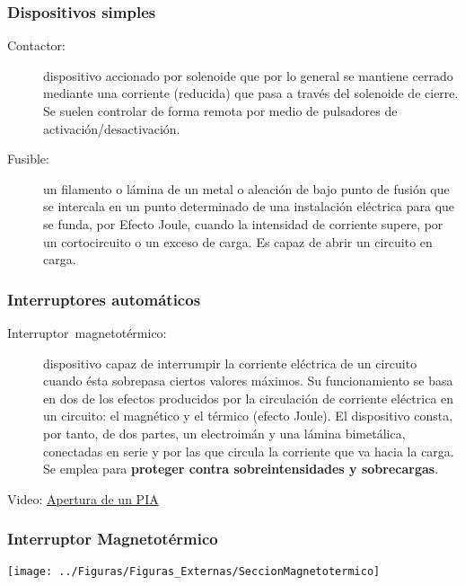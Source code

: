 \documentclass[serif, xcolor=dvipsnames]{beamer}
\begin{document}
\begin{frame}
  \frametitle{Dispositivos simples}
  \begin{description}
  \item [{Contactor:}] dispositivo accionado por solenoide que por lo
    general se mantiene cerrado mediante una corriente (reducida) que
    pasa a través del solenoide de cierre. Se suelen controlar de
    forma remota por medio de pulsadores de activación/desactivación.
  \item [{Fusible:}] un filamento o lámina de un metal o aleación de
    bajo punto de fusión que se intercala en un punto determinado de
    una instalación eléctrica para que se funda, por Efecto Joule,
    cuando la intensidad de corriente supere, por un cortocircuito o
    un exceso de carga. Es capaz de abrir un circuito en carga.
  \end{description}

\end{frame}
\begin{frame}
  \frametitle{Interruptores automáticos}
  \begin{description}
  \item [{Interruptor~magnetotérmico:}] dispositivo capaz de
    interrumpir la corriente eléctrica de un circuito cuando ésta
    sobrepasa ciertos valores máximos. Su funcionamiento se basa en
    dos de los efectos producidos por la circulación de corriente
    eléctrica en un circuito: el magnético y el térmico (efecto
    Joule). El dispositivo consta, por tanto, de dos partes, un
    electroimán y una lámina bimetálica, conectadas en serie y por las
    que circula la corriente que va hacia la carga. Se emplea para
    \textbf{proteger contra sobreintensidades y sobrecargas}.
  \end{description}
  \begin{block}{}
    \centering Video:
    \href{http://www.youtube.com/watch?v=c6QqnLgWbCQ}{Apertura de un
      PIA}
  \end{block}

\end{frame}
\begin{frame}
  \frametitle{Interruptor Magnetotérmico}

  \begin{center}
    \texttt{[image: ../Figuras/Figuras\_Externas/SeccionMagnetotermico]}
    \par\end{center}


\end{frame}
\end{document}
